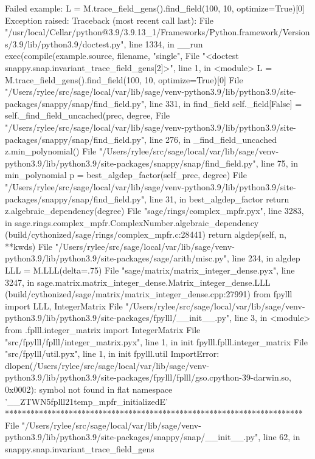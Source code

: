 Failed example:
    L = M.trace_field_gens().find_field(100, 10, optimize=True)[0]
Exception raised:
    Traceback (most recent call last):
      File "/usr/local/Cellar/python@3.9/3.9.13_1/Frameworks/Python.framework/Versions/3.9/lib/python3.9/doctest.py", line 1334, in __run
        exec(compile(example.source, filename, "single",
      File "<doctest snappy.snap.invariant_trace_field_gens[2]>", line 1, in <module>
        L = M.trace_field_gens().find_field(100, 10, optimize=True)[0]
      File "/Users/rylee/src/sage/local/var/lib/sage/venv-python3.9/lib/python3.9/site-packages/snappy/snap/find_field.py", line 331, in find_field
        self._field[False] = self._find_field_uncached(prec, degree,
      File "/Users/rylee/src/sage/local/var/lib/sage/venv-python3.9/lib/python3.9/site-packages/snappy/snap/find_field.py", line 276, in _find_field_uncached
        z.min_polynomial()
      File "/Users/rylee/src/sage/local/var/lib/sage/venv-python3.9/lib/python3.9/site-packages/snappy/snap/find_field.py", line 75, in min_polynomial
        p = best_algdep_factor(self_prec, degree)
      File "/Users/rylee/src/sage/local/var/lib/sage/venv-python3.9/lib/python3.9/site-packages/snappy/snap/find_field.py", line 31, in best_algdep_factor
        return z.algebraic_dependency(degree)
      File "sage/rings/complex_mpfr.pyx", line 3283, in sage.rings.complex_mpfr.ComplexNumber.algebraic_dependency (build/cythonized/sage/rings/complex_mpfr.c:28441)
        return algdep(self, n, **kwds)
      File "/Users/rylee/src/sage/local/var/lib/sage/venv-python3.9/lib/python3.9/site-packages/sage/arith/misc.py", line 234, in algdep
        LLL = M.LLL(delta=.75)
      File "sage/matrix/matrix_integer_dense.pyx", line 3247, in sage.matrix.matrix_integer_dense.Matrix_integer_dense.LLL (build/cythonized/sage/matrix/matrix_integer_dense.cpp:27991)
        from fpylll import LLL, IntegerMatrix
      File "/Users/rylee/src/sage/local/var/lib/sage/venv-python3.9/lib/python3.9/site-packages/fpylll/__init__.py", line 3, in <module>
        from .fplll.integer_matrix import IntegerMatrix
      File "src/fpylll/fplll/integer_matrix.pyx", line 1, in init fpylll.fplll.integer_matrix
      File "src/fpylll/util.pyx", line 1, in init fpylll.util
    ImportError: dlopen(/Users/rylee/src/sage/local/var/lib/sage/venv-python3.9/lib/python3.9/site-packages/fpylll/fplll/gso.cpython-39-darwin.so, 0x0002): symbol not found in flat namespace '__ZTWN5fplll21temp_mpfr_initializedE'
**********************************************************************
File "/Users/rylee/src/sage/local/var/lib/sage/venv-python3.9/lib/python3.9/site-packages/snappy/snap/__init__.py", line 62, in snappy.snap.invariant_trace_field_gens
